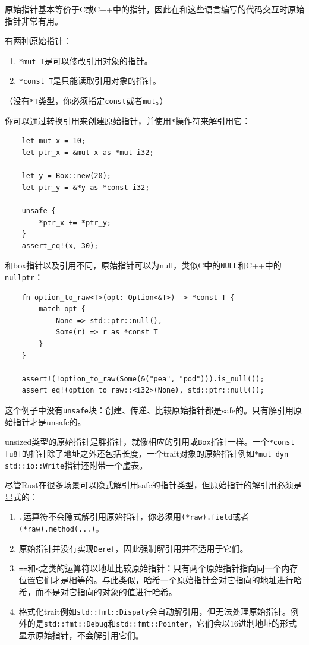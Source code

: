 原始指针基本等价于C或C++中的指针，因此在和这些语言编写的代码交互时原始指针非常有用。

有两种原始指针：
\begin{enumerate}
    \item \texttt{*mut T}是可以修改引用对象的指针。
    \item \texttt{*const T}是只能读取引用对象的指针。
\end{enumerate}
（没有\texttt{*T}类型，你必须指定\texttt{const}或者\texttt{mut}。）

你可以通过转换引用来创建原始指针，并使用\texttt{*}操作符来解引用它：
\begin{verbatim}
    let mut x = 10;
    let ptr_x = &mut x as *mut i32;

    let y = Box::new(20);
    let ptr_y = &*y as *const i32;

    unsafe {
        *ptr_x += *ptr_y;
    }
    assert_eq!(x, 30);
\end{verbatim}

和box指针以及引用不同，原始指针可以为null，类似C中的\texttt{NULL}和C++中的\texttt{nullptr}：
\begin{verbatim}
    fn option_to_raw<T>(opt: Option<&T>) -> *const T {
        match opt {
            None => std::ptr::null(),
            Some(r) => r as *const T
        }
    }

    assert!(!option_to_raw(Some(&("pea", "pod"))).is_null());
    assert_eq!(option_to_raw::<i32>(None), std::ptr::null());
\end{verbatim}

这个例子中没有\texttt{unsafe}块：创建、传递、比较原始指针都是safe的。只有解引用原始指针才是unsafe的。

unsized类型的原始指针是胖指针，就像相应的引用或\texttt{Box}指针一样。一个\texttt{*const [u8]}的指针除了地址之外还包括长度，一个trait对象的原始指针例如\texttt{*mut dyn std::io::Write}指针还附带一个虚表。

尽管Rust在很多场景可以隐式解引用safe的指针类型，但原始指针的解引用必须是显式的：
\begin{enumerate}
    \item \texttt{.}运算符不会隐式解引用原始指针，你必须用\texttt{(*raw).field}或者\texttt{(*raw).method(...)}。
    \item 原始指针并没有实现\texttt{Deref}，因此强制解引用并不适用于它们。
    \item \texttt{==}和\texttt{<}之类的运算符以地址比较原始指针：只有两个原始指针指向同一个内存位置它们才是相等的。与此类似，哈希一个原始指针会对它指向的地址进行哈希，而不是对它指向的对象的值进行哈希。
    \item 格式化trait例如\texttt{std::fmt::Dispaly}会自动解引用，但无法处理原始指针。例外的是\texttt{std::fmt::Debug}和\texttt{std::fmt::Pointer}，它们会以16进制地址的形式显示原始指针，不会解引用它们。
\end{enumerate}

